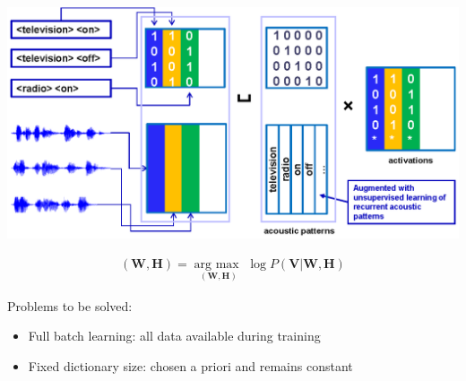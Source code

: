 \documentclass[a0,sans]{esatposter}
\newcommand{\bs}[1]{\boldsymbol{#1}}
\begin{document}
{{		\vspace{2cm}
		\hspace{-5cm}
		\includegraphics[width=1.3\linewidth]{NMF_fig.eps}
		
		\large{
			\begin{align}
				(\bs{W}, \bs{H}) = \underset{(\bs{W}, \bs{H})}{\operatorname{arg\ max\ }} \log P(\bs{V} \vert \bs{W}, \bs{H}) \nonumber
			\end{align}
		}
		\large{
			Problems to be solved:
			\begin{itemize}
				\item Full batch learning: all data available during training
				\item Fixed dictionary size: chosen a priori and remains constant
			\end{itemize}	
		}	
	}
}\hbs
{}
\end{document}

